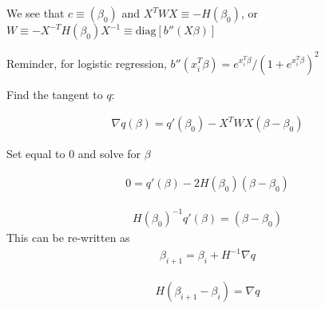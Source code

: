 \documentclass[12pt]{amsart}
\begin{document}
We see that $c\equiv (\beta_0)$ and $X^TWX\equiv -H(\beta_0) $, or $W\equiv -X^{-T}H(\beta_0) X^{-1} \equiv \mbox{diag}[b''(X\beta)]$

Reminder, for logistic regression, $b''(x_i^T\beta) = e^{x_i^T\beta}/(1+ e^{x_i^T\beta})^2$

Find the tangent to $q$:

\begin{align*}
    \nabla q(\beta)=q'(\beta_0) - X^TWX(\beta-\beta_0)
\end{align*}

Set equal to 0 and solve for $\beta$

\begin{align*}
   0=q'(\beta) - 2H(\beta_0)(\beta-\beta_0)
\end{align*}

\begin{align*}
    H(\beta_0)^{-1}q'(\beta) = (\beta-\beta_0)
\end{align*}
This can be re-written as 
\begin{align*}
   \beta_{i+1}= \beta_{i}+H^{-1}\nabla q
\end{align*}


\begin{align*}
   H(\beta_{i+1}-\beta_{i})=\nabla q
\end{align*}
\end{document}
